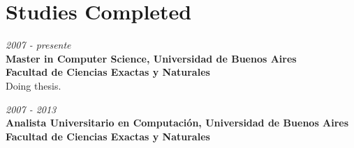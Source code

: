 \section{Studies Completed}

\begin{large}
    \textit{2007 - presente}\\
	   \textbf{Master in Computer Science, Universidad de Buenos Aires}\\
       \textbf{Facultad de Ciencias Exactas y Naturales}\\
	  Doing thesis.\\
\end{large}

\begin{large}
\noindent    \textit{2007 - 2013}\\
	   \textbf{Analista Universitario en Computación, Universidad de Buenos Aires}\\
       \textbf{Facultad de Ciencias Exactas y Naturales}\\
\end{large}

